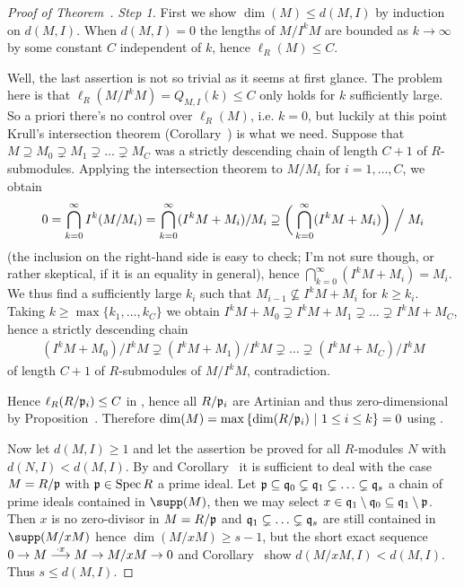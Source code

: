 \documentclass[a4paper,parskip=half,numbers=enddot, DIV=12]{scrreprt}
\begin{document}
\begin{proof}[Proof of Theorem~]
    \emph{Step 1.} First we show $\dim(M) \leq d(M,I)$ by induction on $d(M,I)$. When $d(M,I) = 0$ the lengths of $M/I^kM$ are bounded as $k\to\infty$ by some constant $C$ independent of $k$, hence $\ell_R(M) \leq C$. 
    
    Well, the last assertion is not so trivial as it seems at first glance. The problem here is that $\ell_R(M/I^kM)=Q_{M,I}(k)\leq C$ only holds for $k$ sufficiently large. So a priori there's no control over $\ell_R(M)$, i.e. $k=0$, but luckily at this point Krull's intersection theorem (Corollary~) is what we need. Suppose that $M\supseteq M_0\supsetneq M_1\supsetneq\ldots\supsetneq M_{C}$ was a strictly descending chain of length $C+1$ of $R$-submodules. Applying the intersection theorem to $M/M_i$ for $i=1,\ldots,C$, we obtain 
    \begin{align*}
    	0=\bigcap_{k=0}^\infty I^k(M/M_i)=\bigcap_{k=0}^\infty(I^kM+M_i)/M_i\supseteq\bigg(\bigcap_{k=0}^\infty(I^kM+M_i)\bigg)\Bigm/M_i
    \end{align*}
    (the inclusion on the right-hand side is easy to check; I'm not sure though, or rather skeptical, if it is an equality in general), hence $\bigcap_{k=0}^\infty(I^kM+M_i)=M_i$. We thus find a sufficiently large $k_i$ such that $M_{i-1}\not\subseteq I^kM+M_i$ for $k\geq k_i$. Taking $k\geq\max\{k_1,\ldots,k_C\}$ we obtain $I^kM+M_0\supsetneq I^kM+M_1\supsetneq\ldots\supsetneq I^kM+M_C$, hence a strictly descending chain
    \begin{align*}
    	(I^kM+M_0)/I^kM\supsetneq (I^kM+M_1)/I^kM\supsetneq\ldots\supsetneq (I^kM+M_C)/I^kM
    \end{align*}
    of length $C+1$ of $R$-submodules of $M/I^kM$, contradiction.
    
     Hence $\ell_R(R/\mathfrak{p}_i) \leq C$ in , hence all $R/\mathfrak{p}_i$ are Artinian and thus zero-dimensional by Proposition~. Therefore $\dim(M) = \max\left\{\dim(R/\mathfrak{p}_i)\ \middle|\  1\leq i\leq k\right\} = 0$ using . 
     
     Now let $d(M,I)\geq 1$ and let the assertion be proved for all $R$-modules $N$ with $d(N,I) < d(M,I)$. By  and Corollary~ it is sufficient to deal with the case $M=R/\mathfrak{p}$ with $\mathfrak{p}\in\operatorname{Spec} R$ a prime ideal. Let $\mathfrak{p} \subseteq \mathfrak{q}_0 \subsetneq \mathfrak{q}_1 \subsetneq \ldots \subsetneq \mathfrak{q}_s$ a chain of prime ideals contained in $\supp(M)$, then we may select $x\in \mathfrak{q}_1\setminus \mathfrak{q}_0 \subseteq \mathfrak{q}_1\setminus \mathfrak{p}$. Then $x$ is no zero-divisor in $M=R/\mathfrak{p}$ and $\mathfrak{q}_1\subsetneq \ldots \subsetneq \mathfrak{q}_s$ are still contained in $\supp(M/x M)$ hence $\dim(M/xM) \geq s -1$, but the short exact sequence $0\morphism M\morphism[\cdot x]M \morphism M/xM\morphism0$ and Corollary~ show $d(M/xM,I) <d(M,I)$. Thus $s \leq d(M,I)$.
    

\end{proof}
\end{document}
